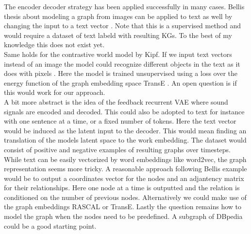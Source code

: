 The encoder decoder strategy has been applied successfully in many cases.
Bellis thesis about modeling a graph from images can be applied to text as well by changing the input to a text vector \cite{belli_image-conditioned_2019}. Note that this is a supervised method and would require a dataset of text labeld with resulting KGs. To the best of my knowledge this does not exist yet.
\\
Same holds for the contrastive world model by Kipf. If we input text vectors instead of an image the model could recognize different objects in the text as it does with pixels \cite{kipf_contrastive_2020}. Here the model is trained unsupervised using a loss over the energy function of the graph embedding space TransE \cite{bordes_translating_2013}. An open question is if this would work for our approach.
\\
A bit more abstract is the idea of the feedback recurrent VAE \cite{yang_feedback_2020} where sound signals are encoded and decoded. This could also be adopted to text for instance with one sentence at a time, or a fixed number of tokens. Here the text vector would be induced as the latent input to the decoder. This would mean finding an translation of the models latent space to the work embedding. The dataset would consist of positive and negative examples of resulting graphs over timesteps.
\\
While text can be easily vectorized by word embeddings like word2vec, the graph representation seems more tricky. A reasonable approach following Bellis example would be to output a coordinates vector for the nodes and an adjantency matrix for their relationships. Here one node at a time is outputted and the relation is conditioned on the number of previous nodes.
Alternatively we could make use of the graph embeddings RASCAL or TransE.
Lastly the question remains how to model the graph when the nodes need to be predefined. A subgraph of DBpedia could be a good starting point.
